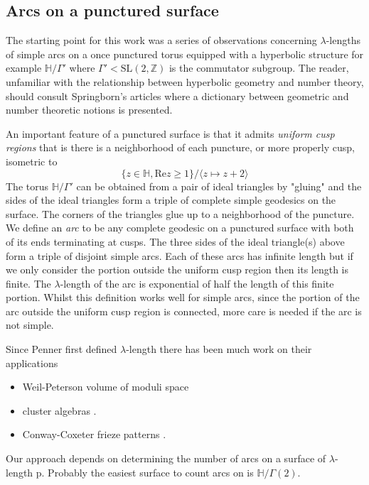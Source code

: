 \documentclass[12pt,a4paper]{amsart}
\def\HH{\mathbb{H}}
\def\g2{\Gamma(2)}
\def\xx{\HH/\g2}
\def\ZZ{\mathbb{Z}}
\def\sl2{\mathrm{SL}(2, \ZZ)}
\begin{document}
\subsection{Arcs on a punctured surface}

The starting point for this work was a series of observations
concerning $\lambda$-lengths of simple arcs on a once punctured
torus equipped with a hyperbolic structure for example $\HH/\Gamma'$
where $\Gamma' < \sl2$ is the commutator subgroup. 
The reader, unfamiliar with the relationship between hyperbolic
geometry and number theory,
should consult Springborn's articles \cite{springborn1, springborn2}
where a dictionary between geometric and number theoretic notions is presented.

An important
feature of a punctured surface is that it admits \textit{uniform
cusp regions} that is there is a neighborhood of each puncture, or more properly cusp, isometric to 
$$\{z\in \mathbb{H}, \mathrm{Re}z \geq 1\}/\langle z \mapsto z+2 \rangle$$  
The  torus $\mathbb{H}/\Gamma'$ can
be obtained from a pair of ideal triangles by "gluing" and the sides
of the ideal triangles form a triple of complete simple geodesics on
the surface. The corners of the triangles glue up to a neighborhood
of the puncture. We define an \textit{arc} to
be any complete geodesic on a punctured surface with both of its
ends terminating at cusps. The three sides of the ideal triangle(s)
above form a triple of disjoint simple arcs. Each of these arcs has
infinite length but if we only consider the portion outside the
uniform cusp region then its length is finite. The $\lambda$-length
of the arc is exponential of half the length of this finite portion.
Whilst this definition works well for simple arcs, since the portion of
the arc
outside the uniform cusp region is connected, more care is needed if
the arc is not simple.

Since Penner first defined $\lambda$-length 
there has been much work on their applications

\begin{itemize}
	\item Weil-Peterson volume of moduli space \cite{bob}
	\item cluster algebras \cite{Fomin}.
	\item Conway-Coxeter frieze patterns \cite{frieze}.
\end{itemize}
Our approach depends on determining the number of arcs on a surface
of $\lambda$-length p.
Probably the easiest surface to count arcs on is $\xx$.
\end{document}
